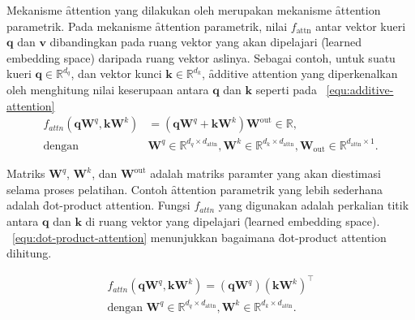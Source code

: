 	Mekanisme \f{attention} yang dilakukan oleh \cite{transformerori} merupakan mekanisme \f{attention} parametrik. Pada mekanisme \f{attention} parametrik, nilai $f_{\text{attn}}$ antar vektor kueri $\mathbf{q}$ dan $\mathbf{v}$ dibandingkan pada ruang vektor yang akan dipelajari (\f{learned embedding space}) daripada ruang vektor aslinya. Sebagai contoh, untuk suatu kueri $\mathbf{q}\in \mathbb{R}^{d_q}$, dan vektor kunci $\mathbf{k} \in \mathbb{R}^{d_k}$, \f{additive attention} yang diperkenalkan oleh \cite{bahdanau2016neural} menghitung nilai keserupaan antara $\mathbf{q}$ dan $\mathbf{k}$ seperti pada \equ~\ref{equ:additive-attention}
	\begin{align}
	\label{equ:additive-attention}
	f_{attn}(\mathbf{q} \mathbf{W}^q, \mathbf{k} \mathbf{W}^k) &= (\mathbf{q} \mathbf{W}^q  + \mathbf{k} \mathbf{W}^k)  \mathbf{W}^{\text{out}} \in \mathbb{R}, \\
	\text{dengan } &\mathbf{W}^q \in \mathbb{R}^{d_q \times d_{\text{attn}}}, \mathbf{W}^k \in \mathbb{R}^{d_k \times d_{\text{attn}}}, \mathbf{W}_{\text{out}} \in \mathbb{R}^{d_{\text{attn}} \times 1}.
	\end{align}

	Matriks $\mathbf{W}^q$, $\mathbf{W}^k$, dan $\mathbf{W}^{\text{out}}$ adalah matriks paramter yang akan diestimasi selama proses pelatihan. Contoh \f{attention} parametrik yang lebih sederhana adalah \f{dot-product attention}. Fungsi $f_{attn}$ yang digunakan adalah perkalian titik antara $\mathbf{q}$ dan $\mathbf{k}$ di ruang vektor yang dipelajari (\f{learned embedding space}). \equ~\ref{equ:dot-product-attention} menunjukkan bagaimana \f{dot-product attention} dihitung.

	\begin{align}
		\label{equ:dot-product-attention}
		f_{attn}(\mathbf{q} \mathbf{W}^q, \mathbf{k} \mathbf{W}^k) = (\mathbf{q} \mathbf{W}^q) (\mathbf{k} \mathbf{W}^k)^{\top}\\
		\text{dengan } \mathbf{W}^q \in \mathbb{R}^{d_q \times d_{\text{attn}}}, \mathbf{W}^k \in \mathbb{R}^{d_k \times d_{\text{attn}}}.
	\end{align}

